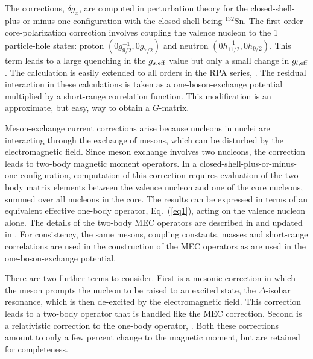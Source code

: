 \documentclass[aps,twocolumn,superscriptaddress,prc,showpacs]{revtex4}
\begin{document}
The corrections, $  \delta g_{x}  $, are computed in perturbation
theory for
the closed-shell-plus-or-minus-one configuration with the closed shell
being $^{132}$Sn.  The first-order core-polarization correction
involves coupling the valence nucleon to the 1$^{ + }$ particle-hole
states: proton $  (0g_{9/2}^{-1},0g_{7/2})  $ and neutron
$  (0h_{11/2}^{-1},0h_{9/2})  $.  This term leads to a large quenching
in the
$  g_{s,{\rm eff}}  $ value but only a small change in
$  g_{l,{\rm eff}}  $.  The calculation is easily extended to all orders
in the RPA series, \cite{To87}.  The residual interaction in these
calculations is taken as a one-boson-exchange potential multiplied by
a short-range correlation function.  This modification is an
approximate, but easy, way to obtain a $  G  $-matrix.

Meson-exchange current corrections arise because nucleons in nuclei are
interacting through the exchange of mesons, which can be disturbed
by the electromagnetic field.  Since meson exchange involves two
nucleons, the correction leads to two-body magnetic moment operators.
In a closed-shell-plus-or-minus-one configuration, computation of this
correction requires evaluation of the two-body matrix elements between
the valence nucleon and one of the core nucleons, summed over all
nucleons in the core.  The results can be expressed in terms of an
equivalent effective one-body operator, Eq.~(\ref{eq1}), acting on   
the valence nucleon alone.  The details of the two-body MEC operators
are described in \cite{To87} and updated in \cite{To96}.  For
consistency, the same mesons, coupling constants, masses and
short-range correlations are used in the construction of the MEC
operators
as are used in the one-boson-exchange potential.

There are two further terms to consider.  First is a mesonic correction
in which the meson prompts the nucleon to be raised to an excited
state, the $  \Delta  $-isobar resonance, which is then de-excited by
the
electromagnetic field.  This correction leads to a two-body operator
that is handled like the MEC correction.  Second is a relativistic
correction to the one-body operator, \cite{To87}.  Both these
corrections
amount to only a few percent change to the magnetic moment, but are
retained for completeness.
\end{document}

